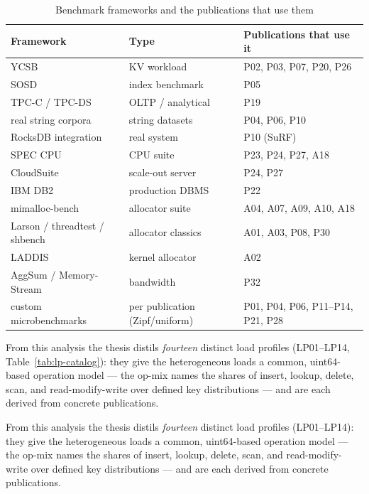 \begin{nurlang}
\begin{table}[!htbp]
  \caption{Benchmark frameworks and the publications that use them}\label{tab:wl-frameworks}
  \centering\footnotesize
  \begin{tabular}{@{}p{3.2cm} p{2.8cm} p{6cm}@{}}
    \toprule
    \textbf{Framework} & \textbf{Type} & \textbf{Publications that use it} \\
    \midrule
    YCSB~\cite{cooper2010ycsb} & KV workload & P02, P03, P07, P20, P26 \\
    SOSD~\cite{kipf2019sosd} & index benchmark & P05 \\
    TPC-C / TPC-DS~\cite{tpc_benchmarks} & OLTP / analytical & P19 \\
    real string corpora & string datasets & P04, P06, P10 \\
    RocksDB integration & real system & P10 (SuRF) \\
    SPEC CPU~\cite{spec_cpu2017} & CPU suite & P23, P24, P27, A18 \\
    CloudSuite~\cite{ferdman2012cloudsuite} & scale-out server & P24, P27 \\
    IBM DB2 & production DBMS & P22 \\
    mimalloc-bench~\cite{mimalloc_bench} & allocator suite & A04, A07, A09, A10, A18 \\
    Larson / threadtest / shbench & allocator classics & A01, A03, P08, P30 \\
    LADDIS & kernel allocator & A02 \\
    AggSum / Memory-Stream & bandwidth & P32 \\
    custom microbenchmarks & per publication (Zipf/uniform) & P01, P04, P06, P11--P14, P21, P28 \\
    \bottomrule
  \end{tabular}
\end{table}
\end{nurlang}

\begin{nurlang}
From this analysis the thesis distils \emph{fourteen} distinct load profiles (LP01--LP14,
Table~\ref{tab:lp-catalog}): they give the heterogeneous loads a common, uint64-based
operation model --- the op-mix names the shares of insert, lookup, delete, scan, and
read-modify-write over defined key distributions --- and are each derived from concrete publications.
\end{nurlang}
\begin{nurkurz}
From this analysis the thesis distils \emph{fourteen} distinct load profiles (LP01--LP14): they give the
heterogeneous loads a common, uint64-based operation model --- the op-mix names the shares of insert,
lookup, delete, scan, and read-modify-write over defined key distributions --- and are each derived from
concrete publications.
\end{nurkurz}

